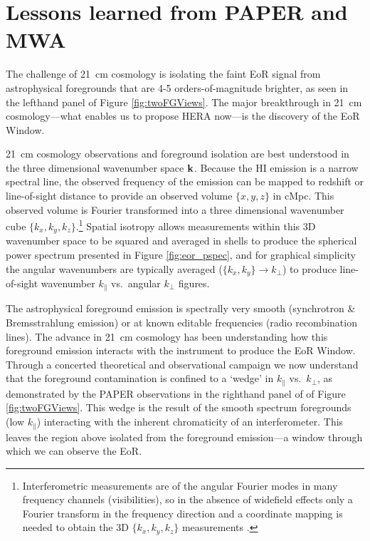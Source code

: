 \documentclass[preprint]{aastex}
\def\kperp{k_{\bot}}
\def\kpar{k_{\|}}
\def\k{{\bf k}}
\def\HI{{H{\small I }}}
\begin{document}
\vspace{-0.25in}
\section{Lessons learned from PAPER and MWA}
\label{LessonsSec}

The challenge of 21~cm cosmology is isolating the faint EoR signal from astrophysical foregrounds that are 4-5 orders-of-magnitude brighter, as seen in the lefthand panel of Figure \ref{fig:twoFGViews}. The major breakthrough in 21~cm cosmology---what enables us to propose HERA now---is the discovery of the EoR Window.

21~cm cosmology observations and foreground isolation are best understood in the three dimensional wavenumber space $\k$.
Because the \HI emission is a narrow spectral line, the observed frequency of the emission can be mapped to redshift or line-of-sight distance to provide an observed volume $\{x,y,z\}$ in cMpc. This observed volume is Fourier transformed into a three dimensional wavenumber cube $\{k_{x}, k_{y}, k_{z}\}$.\footnote{Interferometric measurements are of the angular Fourier modes in many frequency channels (visibilities), so in the absence of widefield effects only a Fourier transform in the frequency direction and a coordinate mapping is needed to obtain the 3D $\{k_{x}, k_{y}, k_{z}\}$ measurements \citep{morales_hewitt2004}.}
Spatial isotropy allows measurements within this 3D wavenumber space to be squared and averaged in shells to produce the spherical power spectrum presented in Figure \ref{fig:eor_pspec}, and for graphical simplicity the angular wavenumbers are typically averaged ($\{k_{x},k_{y}\}\rightarrow\kperp$) to produce line-of-sight wavenumber $\kpar$ vs.\ angular $\kperp$ figures.

The astrophysical foreground emission is spectrally very smooth (synchrotron \& Bremsstrahlung emission) or at known editable frequencies (radio recombination lines). The advance in 21~cm cosmology has been understanding how this foreground emission interacts with the instrument to produce the EoR Window. Through a concerted theoretical and observational campaign \citep{morales_et_al2012,parsons_et_al2012b,vedantham_2012,hazelton_et_al2013,pober_et_al2013,parsons_et_al2013,dillon_et_al2013b} we now understand that the foreground contamination is confined to a `wedge' in $\kpar$ vs.\ $\kperp$, as demonstrated by the PAPER observations in the righthand panel of of Figure \ref{fig:twoFGViews}. This wedge is the result of the smooth spectrum foregrounds (low $\kpar$) interacting with the inherent chromaticity of an interferometer. This leaves the region above isolated from the foreground emission---a window through which we can observe the EoR.
\end{document}
